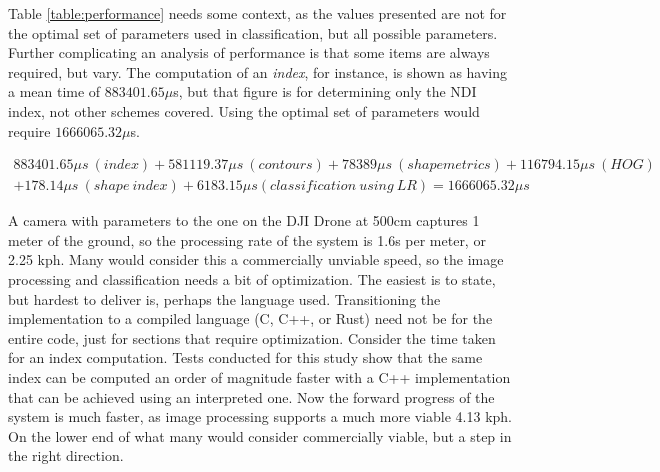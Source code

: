 \documentclass[letterpaper]{report}
\begin{document}
{
\renewcommand{\arraystretch}{0.9}

}

Table \ref{table:performance} needs some context, as the values presented are not for the optimal set of parameters used in classification, but all possible parameters. Further complicating an analysis of performance is that some items are always required, but vary. The computation of an \textit{index}, for instance, is shown as having a mean time of $883401.65 \mu$s, but that figure is for determining only the NDI index, not other schemes covered. Using the optimal set of parameters would require $1666065.32 \mu$s. 

\begin{multline}
883401.65 \mu s\ (index) + 581119.37 \mu s\  (contours) + 78389 \mu s\ (shape metrics) + 116794.15 \mu s\ (HOG) \\ + 178.14 \mu s\ (shape\ index) + 6183.15 \mu s (classification\ using\ LR) = 1666065.32 \mu s
\end{multline}

A camera with parameters to the one on the DJI Drone at 500cm captures 1 meter of the ground, so the processing rate of the system is 1.6s per meter, or 2.25 kph. Many would consider this a commercially unviable speed, so the image processing and classification needs a bit of optimization. The easiest is to state, but hardest to deliver is, perhaps the language used. Transitioning the implementation to a compiled language (C, C++, or Rust) need not be for the entire code, just for sections that require optimization. Consider the time taken for an index computation. Tests conducted for this study show that the same index can be computed an order of magnitude faster with a C++ implementation that can be achieved using an interpreted one. Now the forward progress of the system is much faster, as image processing supports a much more viable 4.13 kph. On the lower end of what many would consider commercially viable, but a step in the right direction.
\end{document}
